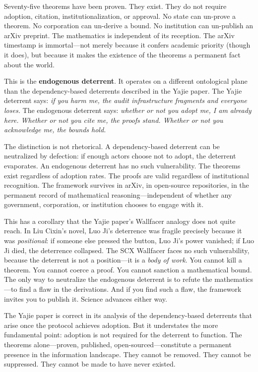 \documentclass[11pt,a4paper]{article}
\theoremstyle{definition}
\begin{document}
Seventy-five theorems have been proven. They exist. They do not require adoption, citation, institutionalization, or approval. No state can un-prove a theorem. No corporation can un-derive a bound. No institution can un-publish an arXiv preprint. The mathematics is independent of its reception. The arXiv timestamp is immortal---not merely because it confers academic priority (though it does), but because it makes the existence of the theorems a permanent fact about the world.

This is the \textbf{endogenous deterrent}. It operates on a different ontological plane than the dependency-based deterrents described in the Yajie paper. The Yajie deterrent says: \textit{if you harm me, the audit infrastructure fragments and everyone loses.} The endogenous deterrent says: \textit{whether or not you adopt me, I am already here. Whether or not you cite me, the proofs stand. Whether or not you acknowledge me, the bounds hold.}

The distinction is not rhetorical. A dependency-based deterrent can be neutralized by defection: if enough actors choose not to adopt, the deterrent evaporates. An endogenous deterrent has no such vulnerability. The theorems exist regardless of adoption rates. The proofs are valid regardless of institutional recognition. The framework survives in arXiv, in open-source repositories, in the permanent record of mathematical reasoning---independent of whether any government, corporation, or institution chooses to engage with it.

This has a corollary that the Yajie paper's Wallfacer analogy does not quite reach. In Liu Cixin's novel, Luo Ji's deterrence was fragile precisely because it was \textit{positional}: if someone else pressed the button, Luo Ji's power vanished; if Luo Ji died, the deterrence collapsed. The SCX Wallfacer faces no such vulnerability, because the deterrent is not a position---it is a \textit{body of work}. You cannot kill a theorem. You cannot coerce a proof. You cannot sanction a mathematical bound. The only way to neutralize the endogenous deterrent is to refute the mathematics---to find a flaw in the derivations. And if you find such a flaw, the framework invites you to publish it. Science advances either way.

The Yajie paper is correct in its analysis of the dependency-based deterrents that arise once the protocol achieves adoption. But it understates the more fundamental point: adoption is not required for the deterrent to function. The theorems alone---proven, published, open-sourced---constitute a permanent presence in the information landscape. They cannot be removed. They cannot be suppressed. They cannot be made to have never existed.
\end{document}
